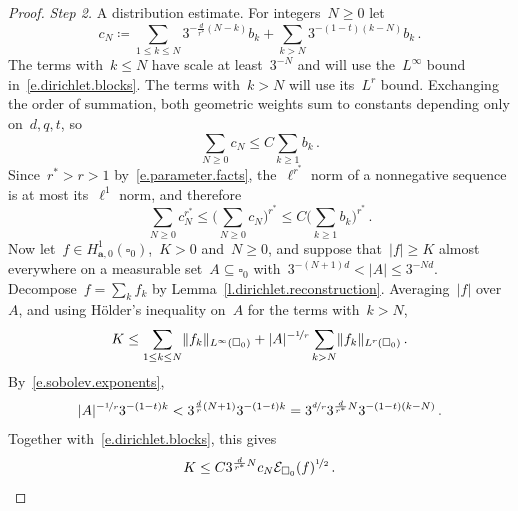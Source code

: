 \documentclass[11pt,letterpaper]{article}
\numberwithin{equation}{section}
\theoremstyle{definition}
\renewcommand{\a}{\mathbf{a}}
\newcommand{\nf}{\nicefrac}
\newcommand{\cu}{\square}
\DeclarePairedDelimiter{\norm}{\lVert}{\rVert}
\newcommand{\Ener}{\mathcal E}
\newcommand{\Hzero}[1]{H^1_{#1,0}}
\begin{document}
\begin{proof}
\emph{Step 2.} A distribution estimate. For integers~$N\geq0$ let
\begin{equation*}
	c_N\coloneqq\sum_{1\leq k\leq N}3^{-\frac d{r^*}(N-k)}b_k+\sum_{k>N}3^{-(1-t)(k-N)}b_k\,.
\end{equation*}
The terms with~$k\leq N$ have scale at least~$3^{-N}$ and will use the~$L^\infty$ bound in~\eqref{e.dirichlet.blocks}. The terms with~$k>N$ will use its~$L^r$ bound. Exchanging the order of summation, both geometric weights sum to constants depending only on~$d,q,t$, so
\begin{equation*}
	\sum_{N\geq0}c_N\leq C\sum_{k\geq1}b_k\,.
\end{equation*}
Since~$r^*>r>1$ by~\eqref{e.parameter.facts}, the~$\ell^{r^*}$ norm of a nonnegative sequence is at most its~$\ell^1$ norm, and therefore
\begin{equation}
	\sum_{N\geq0}c_N^{r^*}\leq\biggl(\sum_{N\geq0}c_N\biggr)^{r^*}\leq C\biggl(\sum_{k\geq1}b_k\biggr)^{r^*}\,.
	\label{e.endpoint.sums}
\end{equation}
Now let~$f\in\Hzero{\a}(\cu_0)$,~$K>0$ and~$N\geq0$, and suppose that~$|f|\geq K$ almost everywhere on a measurable set~$A\subseteq\cu_0$ with~$3^{-(N+1)d}<|A|\leq3^{-Nd}$. Decompose~$f=\sum_kf_k$ by Lemma~\ref{l.dirichlet.reconstruction}. Averaging~$|f|$ over~$A$, and using H\"older's inequality on~$A$ for the terms with~$k>N$,
\begin{equation*}
	K\leq\sum_{1\leq k\leq N}\norm{f_k}_{L^\infty(\cu_0)}+|A|^{-\nf1r}\sum_{k>N}\norm{f_k}_{L^r(\cu_0)}\,.
\end{equation*}
By~\eqref{e.sobolev.exponents},
\begin{equation*}
	|A|^{-\nf1r}3^{-(1-t)k}<3^{\frac dr(N+1)}3^{-(1-t)k}=3^{\nf dr}3^{\frac d{r^*}N}3^{-(1-t)(k-N)}\,.
\end{equation*}
Together with~\eqref{e.dirichlet.blocks}, this gives
\begin{equation}
	K\leq C3^{\frac d{r^*}N}c_N\Ener_{\cu_0}(f)^{\nf12}\,.
	\label{e.endpoint.distribution}
\end{equation}

\smallskip


\end{proof}
\end{document}
